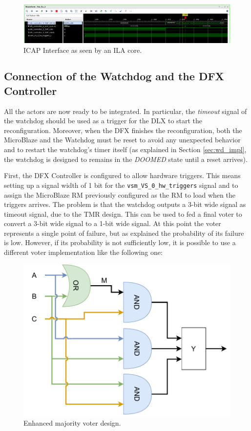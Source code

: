 \begin{figure}[H]
\centering
\includegraphics[width=0.95\linewidth]{images/chapter4/ila_icap.png}
\caption{ICAP Interface as seen by an ILA core.}
\label{fig:icap_ila}
\end{figure}

\subsection{Connection of the Watchdog and the DFX Controller}
All the actors are now ready to be integrated. In particular, the \textit{timeout} signal of the watchdog should be used as a trigger for the DLX to start the reconfiguration. Moreover, when the DFX finishes the reconfiguration, both the MicroBlaze and the Watchdog must be reset to avoid any unexpected behavior and to restart the watchdog's timer itself (as explained in Section \ref{sec:wd_impl}, the watchdog is designed to remains in the \textit{DOOMED} state until a reset arrives). \bigskip

First, the DFX Controller is configured to allow hardware triggers. This means setting up a signal width of 1 bit for the \texttt{vsm\_VS\_0\_hw\_triggers} signal and to assign the MicroBlaze RM previously configured as the RM to load when the triggers arrives. The problem is that the watchdog outputs a 3-bit wide signal as timeout signal, due to the TMR design. This can be used to fed a final voter to convert a 3-bit wide signal to a 1-bit wide signal. At this point the voter represents a single point of failure, but as explained the probability of its failure is low. However, if its probability is not sufficiently low, it is possible to use a different voter implementation like the following one:

\begin{figure}[H]
\centering
\includegraphics[width=0.40\linewidth]{images/chapter4/voter_enh.pdf}
\caption{Enhanced majority voter design.}
\end{figure}

